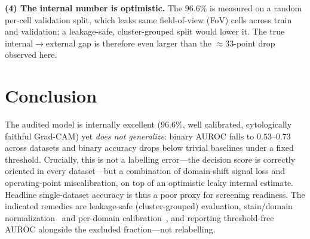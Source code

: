 \documentclass[twocolumn]{article}
\begin{document}
\textbf{(4) The internal number is optimistic.} The $96.6\%$ is measured on a random per-cell
validation split, which leaks same field-of-view (FoV) cells across train and validation; a leakage-safe,
cluster-grouped split would lower it. The true internal$\rightarrow$external gap is therefore even
larger than the $\approx 33$-point drop observed here.

\section{Conclusion}
The audited model is internally excellent ($96.6\%$, well calibrated, cytologically faithful
Grad-CAM) yet \emph{does not generalize}: binary AUROC falls to $0.53$--$0.73$ across datasets and
binary accuracy drops below trivial baselines under a fixed threshold. Crucially, this is not a
labelling error---the decision score is correctly oriented in every dataset---but a combination of
domain-shift signal loss and operating-point miscalibration, on top of an optimistic leaky internal
estimate. Headline single-dataset accuracy is thus a poor proxy for screening readiness. The
indicated remedies are leakage-safe (cluster-grouped) evaluation, stain/domain
normalization~\citep{macenko2009stain} and per-domain calibration~\citep{guo2017calibration}, and
reporting threshold-free AUROC alongside the excluded fraction---not relabelling.



\end{document}
